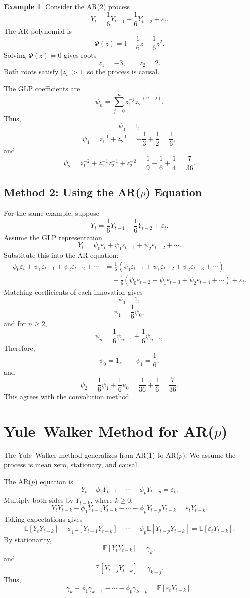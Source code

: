 \documentclass[12pt,oneside]{book}
\numberwithin{equation}{section}
\theoremstyle{definition}
\newtheorem{example}{Example}[section]
\theoremstyle{plain}
\theoremstyle{remark}
\newcommand{\E}{\mathbb{E}}
\begin{document}
\begin{example}
Consider the AR(2) process
\[
Y_t=\frac{1}{6}Y_{t-1}+\frac{1}{6}Y_{t-2}+\varepsilon_t.
\]
The AR polynomial is
\[
\Phi(z)=1-\frac{1}{6}z-\frac{1}{6}z^2.
\]
Solving $\Phi(z)=0$ gives roots
\[
z_1=-3,
\qquad
z_2=2.
\]
Both roots satisfy $|z_i|>1$, so the process is causal.

The GLP coefficients are
\[
\psi_n
=
\sum_{j=0}^{n}z_1^{-j}z_2^{-(n-j)}.
\]
Thus,
\[
\psi_0=1,
\]
\[
\psi_1
=
z_1^{-1}+z_2^{-1}
=
-\frac{1}{3}+\frac{1}{2}
=
\frac{1}{6},
\]
and
\[
\psi_2
=
z_1^{-2}+z_1^{-1}z_2^{-1}+z_2^{-2}
=
\frac{1}{9}-\frac{1}{6}+\frac{1}{4}
=
\frac{7}{36}.
\]
\end{example}

\subsection{Method 2: Using the AR($p$) Equation}

For the same example, suppose
\[
Y_t
=
\frac{1}{6}Y_{t-1}
+
\frac{1}{6}Y_{t-2}
+
\varepsilon_t.
\]
Assume the GLP representation
\[
Y_t
=
\psi_0\varepsilon_t
+
\psi_1\varepsilon_{t-1}
+
\psi_2\varepsilon_{t-2}
+\cdots.
\]
Substitute this into the AR equation:
\begin{align*}
\psi_0\varepsilon_t+\psi_1\varepsilon_{t-1}+\psi_2\varepsilon_{t-2}+\cdots
&=
\frac{1}{6}
(\psi_0\varepsilon_{t-1}+\psi_1\varepsilon_{t-2}+\psi_2\varepsilon_{t-3}+\cdots) \\
&\quad+
\frac{1}{6}
(\psi_0\varepsilon_{t-2}+\psi_1\varepsilon_{t-3}+\psi_2\varepsilon_{t-4}+\cdots)
+
\varepsilon_t.
\end{align*}
Matching coefficients of each innovation gives
\[
\psi_0=1,
\]
\[
\psi_1=\frac{1}{6}\psi_0,
\]
and for $n\geq 2$,
\[
\psi_n
=
\frac{1}{6}\psi_{n-1}
+
\frac{1}{6}\psi_{n-2}.
\]
Therefore,
\[
\psi_0=1,
\qquad
\psi_1=\frac{1}{6},
\]
and
\[
\psi_2
=
\frac{1}{6}\psi_1+\frac{1}{6}\psi_0
=
\frac{1}{36}+\frac{1}{6}
=
\frac{7}{36}.
\]
This agrees with the convolution method.

\section{Yule--Walker Method for AR($p$)}

The Yule--Walker method generalizes from AR(1) to AR($p$). We assume the process is mean zero, stationary, and causal.

The AR($p$) equation is
\[
Y_t-\phi_1Y_{t-1}-\cdots-\phi_pY_{t-p}
=
\varepsilon_t.
\]
Multiply both sides by $Y_{t-k}$, where $k\geq 0$:
\[
Y_tY_{t-k}
-
\phi_1Y_{t-1}Y_{t-k}
-\cdots
-
\phi_pY_{t-p}Y_{t-k}
=
\varepsilon_tY_{t-k}.
\]
Taking expectations gives
\[
\E[Y_tY_{t-k}]
-
\phi_1\E[Y_{t-1}Y_{t-k}]
-\cdots
-
\phi_p\E[Y_{t-p}Y_{t-k}]
=
\E[\varepsilon_tY_{t-k}].
\]
By stationarity,
\[
\E[Y_tY_{t-k}]=\gamma_k,
\]
and
\[
\E[Y_{t-j}Y_{t-k}]
=
\gamma_{k-j}.
\]
Thus,
\[
\gamma_k-\phi_1\gamma_{k-1}-\cdots-\phi_p\gamma_{k-p}
=
\E[\varepsilon_tY_{t-k}].
\]
\end{document}
